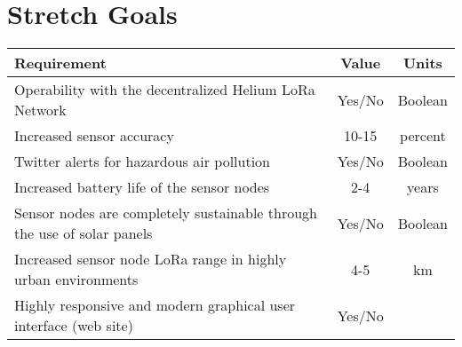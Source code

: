 \section{Stretch Goals}
\begin{tabularx}{\linewidth}{|X|c|c|}
\hline
Requirement & Value & Units \\
\hline
\hline

Operability with the decentralized Helium LoRa Network & Yes/No & Boolean \\\hline
Increased sensor accuracy & 10-15 & percent \\\hline
Twitter alerts for hazardous air pollution & Yes/No & Boolean \\\hline
Increased battery life of the sensor nodes & 2-4 & years \\\hline
Sensor nodes are completely sustainable through the use of solar panels & Yes/No & Boolean \\\hline
Increased sensor node LoRa range in highly urban environments & 4-5 & km \\\hline
Highly responsive and modern graphical user interface (web site) & Yes/No & \\\hline

\end{tabularx}

